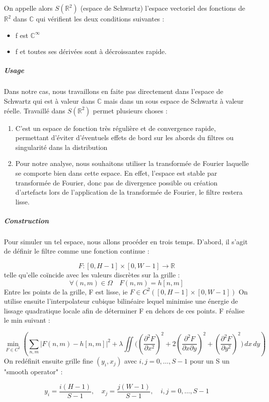 \documentclass[12pt,a4paper]{article}
\begin{document}
On appelle alors $S(\mathbb{R}^2)$ (espace de Schwartz) l'espace vectoriel des fonctions de $\mathbb{R}^2$ dans $\mathbb{C}$ qui vérifient les deux conditions suivantes : 
\begin{itemize}
    \item f est $\mathbb{C^{\infty}}$
    \item f et toutes ses dérivées sont à décroissantes rapide. 
\end{itemize}
\subparagraph{Usage}
Dans notre cas, nous travaillons en faite pas directement dans l'espace de Schwartz qui est à valeur dans $\mathbb{C}$ mais dans un sous espace de Schwartz à valeur réelle.
Travaillé dans $S(\mathbb{R}^2)$ permet plusieurs choses : 
\begin{enumerate}
    \item C'est un espace de fonction très régulière et de convergence rapide, permettant d'éviter d'éventuels effets de bord sur les abords du filtres ou singularité dans la distribution
    \item Pour notre analyse, nous souhaitons utiliser la transformée de Fourier laquelle se comporte bien dans cette espace. En effet, l'espace est stable par transformée de Fourier, donc pas de divergence possible ou création d'artefacts lors de l'application de la transformée de Fourier, le filtre restera lisse.
       
\end{enumerate}
\subparagraph{Construction}
Pour simuler un tel espace, nous allons procéder en trois temps. 
D'abord, il s'agit de définir le filtre comme une fonction continue : 

\[
F : [0, H-1] \times [0, W-1] \to \mathbb{R}
\]
telle qu'elle coïncide avec les valeurs discrètes sur la grille :
\[
\forall (n,m) \in \Omega \quad F(n,m) = h[n,m]
\]
Entre les points de la grille, F est lisse, ie $F \in C^2([0,H-1] \times [0,W-1])$ 
On utilise ensuite l’interpolateur cubique bilinéaire lequel minimise une énergie de lissage quadratique locale afin de déterminer F en dehors de ces points.
F réalise le min suivant : 

\[
\min_{F \in C^2} (\sum_{n,m} \left| F(n,m) - h[n,m] \right|^2 
+ \lambda \iint \Bigg( 
\left(\frac{\partial^2 F}{\partial x^2}\right)^2 
+ 2 \left(\frac{\partial^2 F}{\partial x \partial y}\right)^2 
+ \left(\frac{\partial^2 F}{\partial y^2}\right)^2 
\Bigg) \, dx\, dy)
\]
On redéfinit ensuite grille fine $(y_i, x_j)$ avec 
$i,j = 0, \dots, S-1$ pour un S un "smooth operator" :

\[
y_i = \frac{i(H-1)}{S-1}, \quad x_j = \frac{j(W-1)}{S-1}, \quad i,j = 0,\dots,S-1
\]
\end{document}
